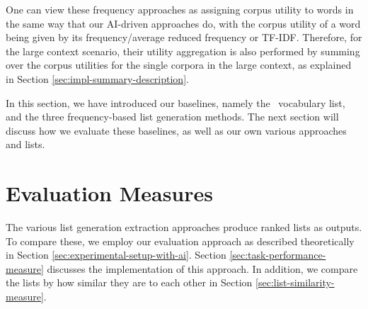 One can view these frequency approaches as assigning corpus utility to words in the same way that our AI-driven approaches do, with the corpus utility of a word being given by its frequency/average reduced frequency or TF-IDF.
Therefore, for the large context scenario, their utility aggregation is also performed by summing over the corpus utilities for the single corpora in the large context, as explained in Section \ref{sec:impl-summary-description}.

In this section, we have introduced our baselines, namely the \Rosetta\ vocabulary list, and the three frequency-based list generation methods.
The next section will discuss how we evaluate these baselines, as well as our own various approaches and lists.

%
%
%


\section{Evaluation Measures}
The various list generation extraction approaches produce ranked lists as outputs.
To compare these, we employ our evaluation approach as described theoretically in Section \ref{sec:experimental-setup-with-ai}.
Section \ref{sec:task-performance-measure} discusses the implementation of this approach.
In addition, we compare the lists by how similar they are to each other in Section \ref{sec:list-similarity-measure}.

